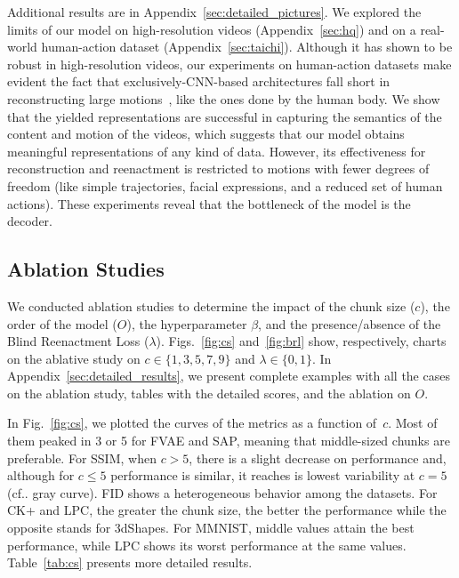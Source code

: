 \documentclass[journal]{IEEEtran}
\makeatletter
\DeclareRobustCommand\onedot{\futurelet\@let@token\@onedot}
\def\@onedot{\ifx\@let@token.\else.\null\fi\xspace}
\def\cf{{cf}\onedot} \def\Cf{{Cf}\onedot}
\makeatother
\begin{document}
Additional results are in Appendix~\ref{sec:detailed_pictures}.
We explored the limits of our model on high-resolution videos (Appendix~\ref{sec:hq}) and on a real-world human-action dataset (Appendix~\ref{sec:taichi}).
Although it has shown to be robust in high-resolution videos, our experiments on human-action datasets make evident the fact that exclusively-CNN-based architectures fall short in reconstructing large motions~\cite{Siarohin2018, Balakrishnan2018}, like the ones done by the human body.
We show that the yielded representations are successful in capturing the semantics of the content and motion of the videos, which suggests that our model obtains meaningful representations of any kind of data.
However, its effectiveness for reconstruction and reenactment is restricted to motions with fewer degrees of freedom (like simple trajectories, facial expressions, and a reduced set of human actions).
These experiments reveal that the bottleneck of the model is the decoder.

\subsection{Ablation Studies}
\label{sec:ablation}

We conducted ablation studies to determine the impact of the chunk size ($c$), the order of the model ($O$), the hyperparameter $\beta$, and the presence/absence of the Blind Reenactment Loss ($\lambda$).
Figs.~\ref{fig:cs} and~\ref{fig:brl} show, respectively, charts on the ablative study on $c \in \{1,3,5,7,9\}$ and $\lambda \in \{0,1\}$.
In Appendix~\ref{sec:detailed_results}, we present complete examples with all the cases on the ablation study, tables with the detailed scores, and the ablation on $O$.

In Fig.~\ref{fig:cs}, we plotted the curves of the metrics as a function of~$c$.
Most of them peaked in \num{3} or \num{5} for FVAE and SAP, meaning that middle-sized chunks are preferable.
For SSIM, when $c > 5$, there is a slight decrease on performance and, although for $c \le 5$ performance is similar, it reaches is lowest variability at $c = 5$ (\cf gray curve).
FID shows a heterogeneous behavior among the datasets.
For CK+ and LPC, the greater the chunk size, the better the performance while the opposite stands for 3dShapes.
For MMNIST, middle values attain the best performance, while LPC shows its worst performance at the same values.
Table~\ref{tab:cs} presents more detailed results.
\end{document}
